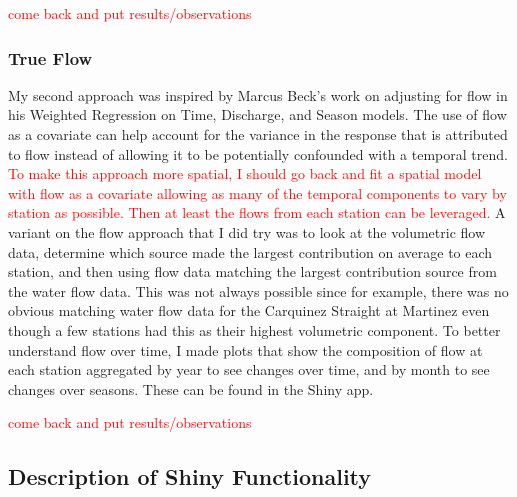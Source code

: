 \documentclass[12pt]{amsart}
\begin{document}
\textcolor{red}{come back and put results/observations}


\subsubsection{True Flow}

My second approach was inspired by Marcus Beck's work on adjusting for flow in his Weighted Regression on Time, Discharge, and Season models. The use of flow as a covariate can help account for the variance in the response that is attributed to flow instead of allowing it to be potentially confounded with a temporal trend. \textcolor{red}{To make this approach more spatial, I should go back and fit a spatial model with flow as a covariate allowing as many of the temporal components to vary by station as possible. Then at least the flows from each station can be leveraged.} A variant on the flow approach that I did try was to look at the volumetric flow data, determine which source made the largest contribution on average to each station, and then using flow data matching the largest contribution source from the water flow data. This was not always possible since for example, there was no obvious matching water flow data for the Carquinez Straight at Martinez even though a few stations had this as their highest volumetric component. To better understand flow over time, I  made plots that show the composition of flow at each station aggregated by year to see changes over time, and by month to see changes over seasons. These can be found in the Shiny app.

\textcolor{red}{come back and put results/observations}

\subsection{Description of Shiny Functionality}
\end{document}
